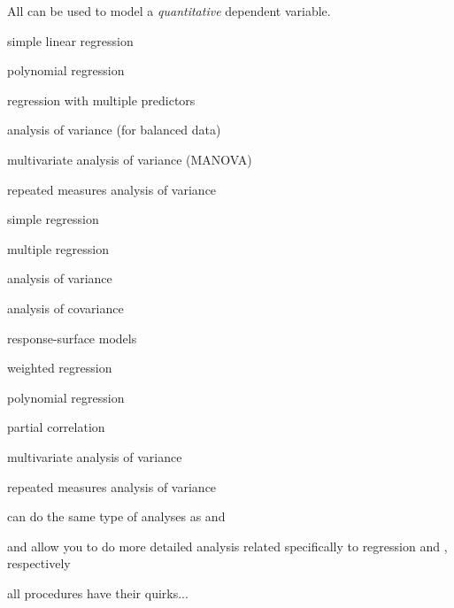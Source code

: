 \begin{frame}
All can be used to model a \emph{quantitative} dependent variable.
\vskip5pt
\underline{}
\bi
\item simple linear regression
\item polynomial regression
\item regression with multiple predictors
\item[]
\item[]
\item[]
\item[]
\item[]
\ei
\emp
{}
\underline{}
\bi
\item analysis of variance (for balanced data)
\item multivariate analysis of variance (MANOVA)
\item  repeated measures analysis of variance
\item[]
\item[]
\ei
\emp
{}
\underline{}
\bi
\item  simple regression
\item  multiple regression
\item  analysis of variance
\item  analysis of covariance
\item  response-surface models
\item  weighted regression
\item  polynomial regression
\item  partial correlation
\item  multivariate analysis of variance
\item  repeated measures analysis of variance
\ei
\emp
\end{frame}


\begin{frame}
\bi
\item {} can do the same type of analyses as  and 
\item {} and  allow you to do more detailed analysis related specifically to regression and , respectively
\item all procedures have their quirks...
\ei
\end{frame}

